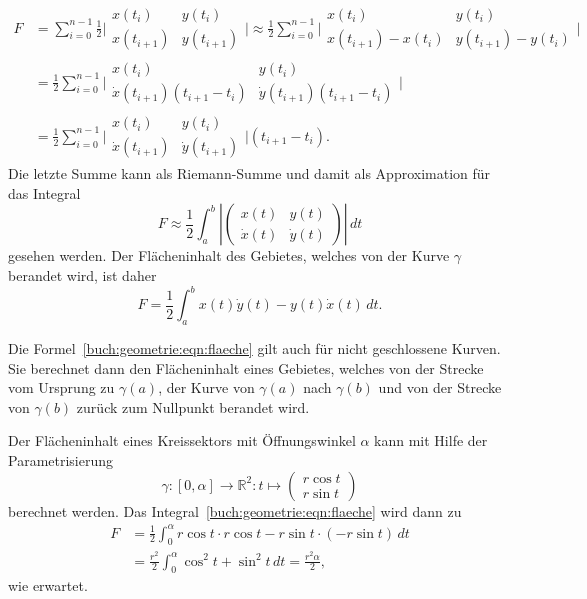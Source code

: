 \begin{align*}
F
&=
\sum_{i=0}^{n-1}
\frac12
\biggl|\begin{matrix}
x(t_i)    &y(t_i)    \\
x(t_{i+1})&y(t_{i+1})
\end{matrix}\biggr|
\approx
\frac12
\sum_{i=0}^{n-1}
\biggl|\begin{matrix}
x(t_i)    &y(t_i)    \\
x(t_{i+1})-x(t_i)&y(t_{i+1})-y(t_i)
\end{matrix}\biggr|
\\
&=
\frac12
\sum_{i=0}^{n-1}
\biggl|\begin{matrix}
x(t_i)                        &y(t_i)    \\
\dot{x}(t_{i+1}) (t_{i+1}-t_i)& \dot{y}(t_{i+1}) (t_{i+1}-t_i)
\end{matrix}\biggr|
\\
&=
\frac12
\sum_{i=0}^{n-1}
\biggl|\begin{matrix}
x(t_i)           &y(t_i)    \\
\dot{x}(t_{i+1}) & \dot{y}(t_{i+1})
\end{matrix}\biggr|
(t_{i+1}-t_{i}).
\end{align*}
Die letzte Summe kann als Riemann-Summe und damit als Approximation für
das Integral
\[
F
\approx
\frac12
\int_a^b
\left|\begin{pmatrix} x(t)&y(t)\\\dot{x}(t)&\dot{y}(t)\end{pmatrix}\right|
\,dt
\]
gesehen werden.
Der Flächeninhalt des Gebietes, welches von der Kurve $\gamma$
berandet wird, ist daher
\begin{equation}
F
=
\frac12
\int_a^b x(t)\dot{y}(t)-y(t)\dot{x}(t)\,dt.
\label{buch:geometrie:eqn:flaeche}
\end{equation}

Die Formel~\eqref{buch:geometrie:eqn:flaeche} gilt auch für nicht
geschlossene Kurven.
Sie berechnet dann den Flächeninhalt eines Gebietes, welches von
der Strecke vom Ursprung zu $\gamma(a)$, der Kurve von $\gamma(a)$ nach
$\gamma(b)$ und von der Strecke von $\gamma(b)$ zurück zum Nullpunkt
berandet wird.

\begin{beispiel}
Der Flächeninhalt eines Kreissektors mit Öffnungswinkel $\alpha$
kann mit Hilfe der Parametrisierung
\[
\gamma
\colon
[0,\alpha] \to \mathbb{R}^2
:
t\mapsto \begin{pmatrix}r\cos t\\ r\sin t\end{pmatrix}
\]
berechnet werden.
Das Integral~\eqref{buch:geometrie:eqn:flaeche} wird dann zu
\begin{align*}
F
&=
\frac12
\int_0^\alpha r\cos t \cdot r\cos t - r\sin t \cdot (-r\sin t)\,dt
\\
&=
\frac{r^2}2
\int_0^\alpha
\cos^2t + \sin^2t\,dt
=
\frac{r^2\alpha}2,
\end{align*}
wie erwartet.
\end{beispiel}

